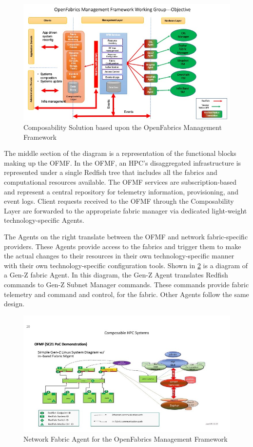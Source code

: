 \begin{figure}
  \centerline{\includegraphics[width=\columnwidth]{Slide19.jpeg}}
  \caption{Composability Solution based upon the OpenFabrics Management Framework}
  \label{fig:ofmf}
\end{figure}

The middle section of the diagram is a representation of the functional blocks making up the OFMF.  In the OFMF, an HPC's disaggregated infrastructure is represented under a single Redfish tree that includes all the fabrics and computational resources available. The OFMF services are subscription-based and represent a central repository for telemetry information, provisioning, and event logs.  Client requests received to the OFMF through the Composability Layer are forwarded to the appropriate fabric manager via dedicated light-weight technology-specific Agents. 

The Agents on the right translate between the OFMF and network fabric-specific providers.  These Agents provide access to the fabrics and trigger them to make the actual changes to their resources in their own technology-specific manner with their own technology-specific configuration tools.  Shown in \ref{fig:agent} is a diagram of a Gen-Z fabric Agent.  In this diagram, the Gen-Z Agent translates Redfish commands to Gen-Z Subnet Manager commands.  These commands provide fabric telemetry and command and control, for the fabric.  Other Agents follow the same design.

\begin{figure}
  \centerline{\includegraphics[width=\columnwidth]{Slide20.jpeg}}
  \caption{Network Fabric Agent for the OpenFabrics Management Framework}
  \label{fig:agent}
\end{figure}



